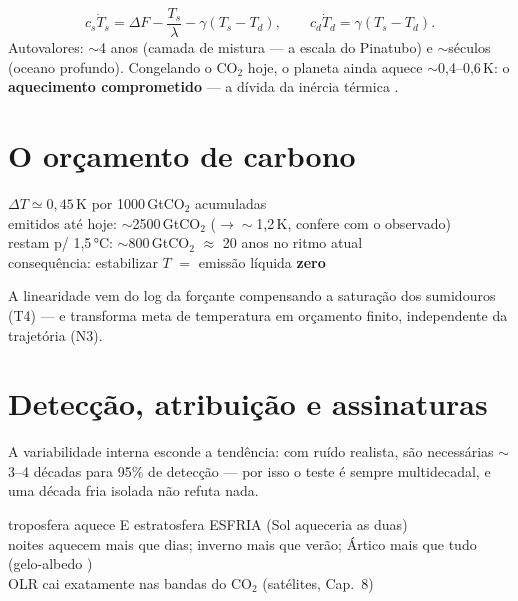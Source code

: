 \documentclass[11pt]{article}
\begin{document}
\begin{formadif}
\[ c_s\dot T_s = \Delta F - \frac{T_s}{\lambda} - \gamma(T_s - T_d),
\qquad c_d\dot T_d = \gamma(T_s - T_d). \]
Autovalores: $\sim$4 anos (camada de mistura — a escala do Pinatubo)
e $\sim$séculos (oceano profundo). Congelando o CO$_2$ hoje, o
planeta ainda aquece $\sim$0,4--0,6\,K: o \textbf{aquecimento
comprometido} — a dívida da inércia térmica .
\end{formadif}

\section{O orçamento de carbono}\label{sec:tcre}


\begin{noquadro}
$\Delta T \simeq 0{,}45$\,K por 1000\,GtCO$_2$ acumuladas\\
emitidos até hoje: $\sim$2500\,GtCO$_2$ ($\to \sim$1,2\,K, confere
com o observado)\\
restam p/ 1,5\,°C: $\sim$800\,GtCO$_2$ $\approx$ 20 anos no ritmo
atual\\[2pt]
consequência: estabilizar $T$ $=$ emissão líquida \textbf{zero}
\end{noquadro}

A linearidade vem do log da forçante compensando a saturação dos
sumidouros (T4) — e transforma meta de temperatura em orçamento
finito, independente da trajetória (N3).

\section{Detecção, atribuição e assinaturas}\label{sec:detec}

\begin{formadif}
A variabilidade interna  esconde a
tendência: com ruído realista, são necessárias $\sim$3--4 décadas
para 95\% de detecção — por isso o teste é sempre multidecadal, e uma
década fria isolada não refuta nada.
\end{formadif}

\begin{noquadro}
troposfera aquece E estratosfera ESFRIA (Sol aqueceria as duas)\\
noites aquecem mais que dias; inverno mais que verão; Ártico mais que
tudo (gelo-albedo )\\
OLR cai exatamente nas bandas do CO$_2$ (satélites, Cap.~8)
\end{noquadro}
\end{document}
